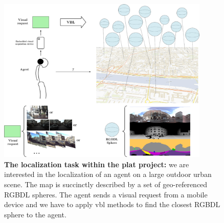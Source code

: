 \begin{figure}[t]
	\centering

	\includegraphics[width=0.9\textwidth]{env/plat_resume}
	\caption[Localization task in \acs*{plat}]{ \label{fig:plat_pipeline} \textbf{The localization task within the \acs*{plat} project:} we are interested in the localization of an agent on a large outdoor urban scene. The map is succinctly described by a set of geo-referenced RGBDL spheres. The agent sends a visual request from a mobile device and we have to apply \ac*{vbl} methods to find the closest RGBDL sphere to the agent.}
\end{figure}
